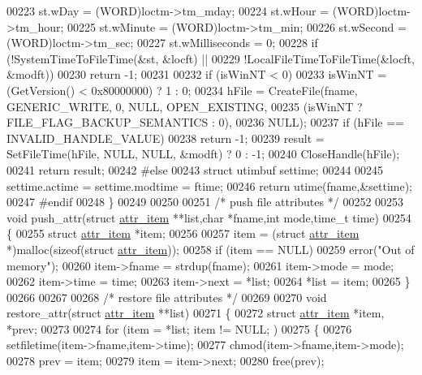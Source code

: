 \begin{DoxyCode}
{{{00223   st.wDay          = (WORD)loctm->tm\_mday;
00224   st.wHour         = (WORD)loctm->tm\_hour;
00225   st.wMinute       = (WORD)loctm->tm\_min;
00226   st.wSecond       = (WORD)loctm->tm\_sec;
00227   st.wMilliseconds = 0;
00228   if (!SystemTimeToFileTime(&st, &locft) ||
00229       !LocalFileTimeToFileTime(&locft, &modft))
00230     \textcolor{keywordflow}{return} -1;
00231 
00232   \textcolor{keywordflow}{if} (isWinNT < 0)
00233     isWinNT = (GetVersion() < 0x80000000) ? 1 : 0;
00234   hFile = CreateFile(fname, GENERIC\_WRITE, 0, NULL, OPEN\_EXISTING,
00235                      (isWinNT ? FILE\_FLAG\_BACKUP\_SEMANTICS : 0),
00236                      NULL);
00237   \textcolor{keywordflow}{if} (hFile == INVALID\_HANDLE\_VALUE)
00238     \textcolor{keywordflow}{return} -1;
00239   result = SetFileTime(hFile, NULL, NULL, &modft) ? 0 : -1;
00240   CloseHandle(hFile);
00241   \textcolor{keywordflow}{return} result;
00242 \textcolor{preprocessor}{#else}
00243   \textcolor{keyword}{struct }utimbuf settime;
00244 
00245   settime.actime = settime.modtime = ftime;
00246   \textcolor{keywordflow}{return} utime(fname,&settime);
00247 \textcolor{preprocessor}{#endif}
00248 \}
00249 
00250 
00251 \textcolor{comment}{/* push file attributes */}
00252 
00253 \textcolor{keywordtype}{void} push\_attr(\textcolor{keyword}{struct} \hyperlink{structattr__item}{attr\_item} **list,\textcolor{keywordtype}{char} *fname,\textcolor{keywordtype}{int} mode,time\_t time)
00254 \{
00255   \textcolor{keyword}{struct }\hyperlink{structattr__item}{attr\_item} *item;
00256 
00257   item = (\textcolor{keyword}{struct }\hyperlink{structattr__item}{attr\_item} *)malloc(\textcolor{keyword}{sizeof}(\textcolor{keyword}{struct} \hyperlink{structattr__item}{attr\_item}));
00258   \textcolor{keywordflow}{if} (item == NULL)
00259     error(\textcolor{stringliteral}{"Out of memory"});
00260   item->fname = strdup(fname);
00261   item->mode  = mode;
00262   item->time  = time;
00263   item->next  = *list;
00264   *list       = item;
00265 \}
00266 
00267 
00268 \textcolor{comment}{/* restore file attributes */}
00269 
00270 \textcolor{keywordtype}{void} restore\_attr(\textcolor{keyword}{struct} \hyperlink{structattr__item}{attr\_item} **list)
00271 \{
00272   \textcolor{keyword}{struct }\hyperlink{structattr__item}{attr\_item} *item, *prev;
00273 
00274   \textcolor{keywordflow}{for} (item = *list; item != NULL; )
00275     \{
00276       setfiletime(item->fname,item->time);
00277       chmod(item->fname,item->mode);
00278       prev = item;
00279       item = item->next;
00280       free(prev);
}}}
\end{DoxyCode}
